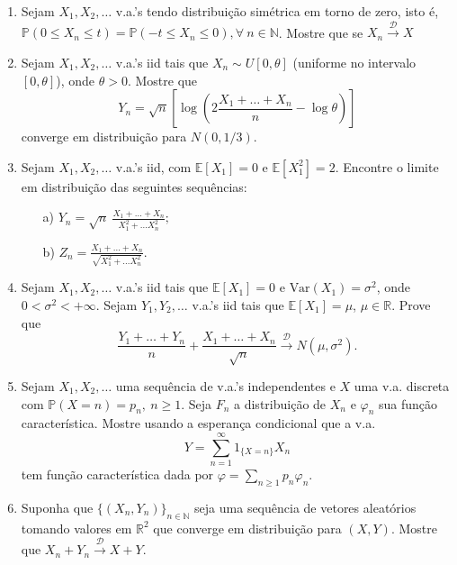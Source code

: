 \begin{enumerate}[leftmargin=*]
\item 
Sejam $X_1,X_2,\ldots$ v.a.'s tendo distribuição 
simétrica em torno de zero, isto é, 
$\mathbb{P}(0\leq X_n\leq t) 
= 
\mathbb{P}(-t\leq X_n\leq 0)
, \forall \ n\in\mathbb{N}$.
Mostre que se 
$X_n \overset{\mathscr{D}}{\rightarrow} X$




\item Sejam $X_1,X_2,\ldots$ v.a.'s iid tais que 
$X_n\sim U[0,\theta]$ (uniforme no intervalo $[0,\theta]$),
onde $\theta>0$. Mostre que 
\[
	Y_n
	=
	\sqrt{n}
	\left[ 
		\log\left(
		2\frac{X_1+\ldots+X_n}{n} - \log\theta 
		\right)
	\right]
\]
converge em distribuição para $N(0,1/3)$.




\item 
Sejam $X_1,X_2,\ldots$ v.a.'s iid, com 
$\mathbb{E}[X_1]=0$ e $\mathbb{E}[X_1^2]=2$.
Encontre o limite em distribuição das seguintes
sequências:
\begin{itemize}
	\item[a)] 
	$
	Y_n 
	= 
	\sqrt{n} 
	\displaystyle\ \frac{X_1+\ldots+X_n}{X_1^2+\ldots X_n^2};
	$
	
	
	\item[b)]
	$
	Z_n 
	= 
	\displaystyle 
	\frac{X_1+\ldots+X_n}{\sqrt{X_1^2+\ldots X_n^2}}.
	$
\end{itemize}




\item
Sejam $X_1,X_2,\ldots$ v.a.'s iid tais que 
$\mathbb{E}[X_1]=0$ e $\text{Var}(X_1)=\sigma^2$,
onde $0<\sigma^2<+\infty$. Sejam $Y_1,Y_2,\ldots$
v.a.'s iid tais que $\mathbb{E}[X_1]=\mu$, $\mu\in\mathbb{R}$.
Prove que 
\[
	\frac{Y_1+\ldots+Y_n}{n}
	+
	\frac{X_1+\ldots+X_n}{\sqrt{n}}
	\overset{\mathscr{D}}{\rightarrow}
	N(\mu,\sigma^2).
\] 




\item Sejam $X_1,X_2,\ldots$ uma sequência de v.a.'s independentes
e $X$ uma v.a. discreta com $\mathbb{P}(X=n)=p_n,\ n\geq 1$.
Seja $F_n$ a distribuição de $X_n$ e $\varphi_n$
sua função característica. Mostre usando a esperança condicional 
que a v.a. 
\[
	Y= \sum_{n=1}^{\infty} 1_{\{X=n\}}X_n
\]  
tem função característica dada por $\varphi = \sum_{n\geq 1}p_n\varphi_n$.






\item 
Suponha que $\{(X_n,Y_n)\}_{n\in\mathbb{N}}$ 
seja uma sequência de vetores aleatórios tomando 
valores em $\mathbb{R}^2$ que converge em distribuição 
para $(X,Y)$. Mostre que 
$X_n+Y_n \overset{\mathscr{D}}{\rightarrow} X+Y$.




\end{enumerate}
